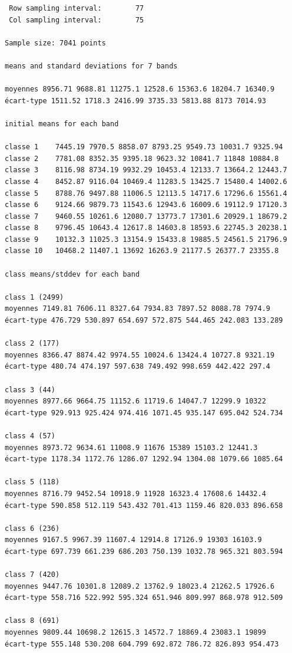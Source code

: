 \documentclass[earth,article,submit,pdftex,moreauthors]{Definitions/mdpi}
\begin{document}
{\begin{scriptsize}
\begin{verbatim}
 Row sampling interval:        77
 Col sampling interval:        75

Sample size: 7041 points

means and standard deviations for 7 bands

moyennes 8956.71 9688.81 11275.1 12528.6 15363.6 18204.7 16340.9
écart-type 1511.52 1718.3 2416.99 3735.33 5813.88 8173 7014.93

initial means for each band

classe 1    7445.19 7970.5 8858.07 8793.25 9549.73 10031.7 9325.94
classe 2    7781.08 8352.35 9395.18 9623.32 10841.7 11848 10884.8
classe 3    8116.98 8734.19 9932.29 10453.4 12133.7 13664.2 12443.7
classe 4    8452.87 9116.04 10469.4 11283.5 13425.7 15480.4 14002.6
classe 5    8788.76 9497.88 11006.5 12113.5 14717.6 17296.6 15561.4
classe 6    9124.66 9879.73 11543.6 12943.6 16009.6 19112.9 17120.3
classe 7    9460.55 10261.6 12080.7 13773.7 17301.6 20929.1 18679.2
classe 8    9796.45 10643.4 12617.8 14603.8 18593.6 22745.3 20238.1
classe 9    10132.3 11025.3 13154.9 15433.8 19885.5 24561.5 21796.9
classe 10   10468.2 11407.1 13692 16263.9 21177.5 26377.7 23355.8

class means/stddev for each band

class 1 (2499)
moyennes 7149.81 7606.11 8327.64 7934.83 7897.52 8088.78 7974.9
écart-type 476.729 530.897 654.697 572.875 544.465 242.083 133.289

class 2 (177)
moyennes 8366.47 8874.42 9974.55 10024.6 13424.4 10727.8 9321.19
écart-type 480.74 474.197 597.638 749.492 998.659 442.422 297.4

class 3 (44)
moyennes 8977.66 9664.75 11152.6 11719.6 14047.7 12299.9 10322
écart-type 929.913 925.424 974.416 1071.45 935.147 695.042 524.734

class 4 (57)
moyennes 8973.72 9634.61 11008.9 11676 15389 15103.2 12441.3
écart-type 1178.34 1172.76 1286.07 1292.94 1304.08 1079.66 1085.64

class 5 (118)
moyennes 8716.79 9452.54 10918.9 11928 16323.4 17608.6 14432.4
écart-type 590.858 512.119 543.432 701.413 1159.46 820.033 896.658

class 6 (236)
moyennes 9167.5 9967.39 11607.4 12914.8 17126.9 19303 16103.9
écart-type 697.739 661.239 686.203 750.139 1032.78 965.321 803.594

class 7 (420)
moyennes 9447.76 10301.8 12089.2 13762.9 18023.4 21262.5 17926.6
écart-type 558.716 522.992 595.324 651.946 809.997 868.978 912.509

class 8 (691)
moyennes 9809.44 10698.2 12615.3 14572.7 18869.4 23083.1 19899
écart-type 555.148 530.208 604.799 692.872 786.72 826.893 954.473


\end{verbatim}
\end{scriptsize}}
\end{document}
